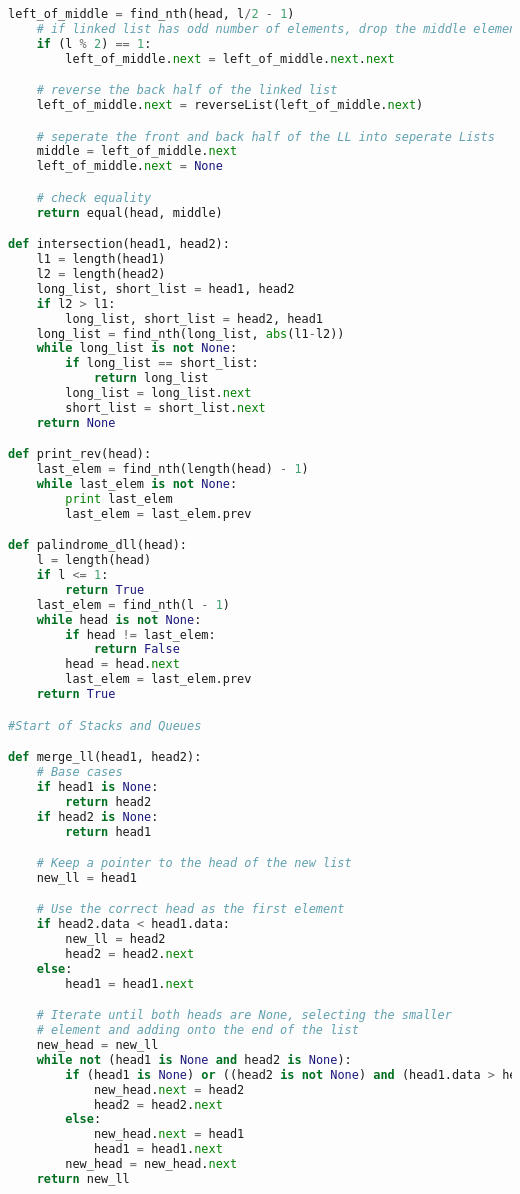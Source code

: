 \documentclass{article}
\begin{document}
\begin{lstlisting}[language=Python]
    left_of_middle = find_nth(head, l/2 - 1)
    # if linked list has odd number of elements, drop the middle element
    if (l % 2) == 1:
        left_of_middle.next = left_of_middle.next.next

    # reverse the back half of the linked list
    left_of_middle.next = reverseList(left_of_middle.next)

    # seperate the front and back half of the LL into seperate Lists
    middle = left_of_middle.next
    left_of_middle.next = None

    # check equality
    return equal(head, middle)

def intersection(head1, head2):
    l1 = length(head1)
    l2 = length(head2)
    long_list, short_list = head1, head2
    if l2 > l1:
        long_list, short_list = head2, head1
    long_list = find_nth(long_list, abs(l1-l2))
    while long_list is not None:
        if long_list == short_list:
            return long_list
        long_list = long_list.next
        short_list = short_list.next
    return None

def print_rev(head):
    last_elem = find_nth(length(head) - 1)
    while last_elem is not None:
        print last_elem
        last_elem = last_elem.prev

def palindrome_dll(head):
    l = length(head)
    if l <= 1:
        return True
    last_elem = find_nth(l - 1)
    while head is not None:
        if head != last_elem:
            return False
        head = head.next
        last_elem = last_elem.prev
    return True

#Start of Stacks and Queues

def merge_ll(head1, head2):
    # Base cases
    if head1 is None:
        return head2
    if head2 is None:
        return head1

    # Keep a pointer to the head of the new list
    new_ll = head1

    # Use the correct head as the first element
    if head2.data < head1.data:
        new_ll = head2
        head2 = head2.next
    else:
        head1 = head1.next

    # Iterate until both heads are None, selecting the smaller
    # element and adding onto the end of the list
    new_head = new_ll
    while not (head1 is None and head2 is None):
        if (head1 is None) or ((head2 is not None) and (head1.data > head2.data)):
            new_head.next = head2
            head2 = head2.next
        else:
            new_head.next = head1
            head1 = head1.next
        new_head = new_head.next
    return new_ll


\end{lstlisting}
\end{document}
